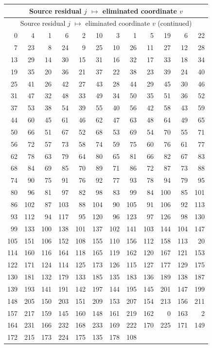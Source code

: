 \begin{longtable}{*{6}{r@{\,$\mapsto$\,}r}}
\hline
\multicolumn{12}{c}{Source residual $j$ $\mapsto$ eliminated coordinate $v$}\\
\hline
\endfirsthead
\hline
\multicolumn{12}{c}{Source residual $j$ $\mapsto$ eliminated coordinate $v$ (continued)}\\
\hline
\endhead
0 & 4 & 1 & 6 & 2 & 10 & 3 & 1 & 5 & 19 & 6 & 22 \\
7 & 23 & 8 & 24 & 9 & 25 & 10 & 26 & 11 & 27 & 12 & 28 \\
13 & 29 & 14 & 30 & 15 & 31 & 16 & 32 & 17 & 33 & 18 & 34 \\
19 & 35 & 20 & 36 & 21 & 37 & 22 & 38 & 23 & 39 & 24 & 40 \\
25 & 41 & 26 & 42 & 27 & 43 & 28 & 44 & 29 & 45 & 30 & 46 \\
31 & 47 & 32 & 48 & 33 & 49 & 34 & 50 & 35 & 51 & 36 & 52 \\
37 & 53 & 38 & 54 & 39 & 55 & 40 & 56 & 42 & 58 & 43 & 59 \\
44 & 60 & 45 & 61 & 46 & 62 & 47 & 63 & 48 & 64 & 49 & 65 \\
50 & 66 & 51 & 67 & 52 & 68 & 53 & 69 & 54 & 70 & 55 & 71 \\
56 & 72 & 57 & 73 & 58 & 74 & 59 & 75 & 60 & 76 & 61 & 77 \\
62 & 78 & 63 & 79 & 64 & 80 & 65 & 81 & 66 & 82 & 67 & 83 \\
68 & 84 & 69 & 85 & 70 & 89 & 71 & 86 & 72 & 87 & 73 & 88 \\
74 & 90 & 75 & 91 & 76 & 92 & 77 & 93 & 78 & 94 & 79 & 95 \\
80 & 96 & 81 & 97 & 82 & 98 & 83 & 99 & 84 & 100 & 85 & 101 \\
86 & 102 & 87 & 103 & 88 & 104 & 90 & 105 & 91 & 106 & 92 & 113 \\
93 & 112 & 94 & 117 & 95 & 120 & 96 & 123 & 97 & 126 & 98 & 130 \\
99 & 133 & 100 & 138 & 101 & 137 & 102 & 141 & 103 & 144 & 104 & 147 \\
105 & 151 & 106 & 152 & 108 & 155 & 110 & 156 & 112 & 158 & 113 & 20 \\
114 & 160 & 116 & 164 & 118 & 165 & 119 & 162 & 120 & 167 & 121 & 153 \\
122 & 171 & 124 & 114 & 125 & 173 & 126 & 115 & 127 & 177 & 129 & 175 \\
130 & 181 & 132 & 179 & 133 & 185 & 135 & 183 & 136 & 189 & 138 & 187 \\
139 & 193 & 141 & 191 & 142 & 197 & 144 & 195 & 145 & 201 & 147 & 199 \\
148 & 205 & 150 & 203 & 151 & 209 & 153 & 207 & 154 & 213 & 156 & 211 \\
157 & 217 & 159 & 145 & 160 & 148 & 161 & 219 & 162 & 0 & 163 & 2 \\
164 & 231 & 166 & 232 & 168 & 233 & 169 & 222 & 170 & 225 & 171 & 149 \\
172 & 215 & 173 & 224 & 175 & 135 & 178 & 108 & \multicolumn{2}{c}{} & \multicolumn{2}{c}{} \\
\hline
\end{longtable}
\endgroup

